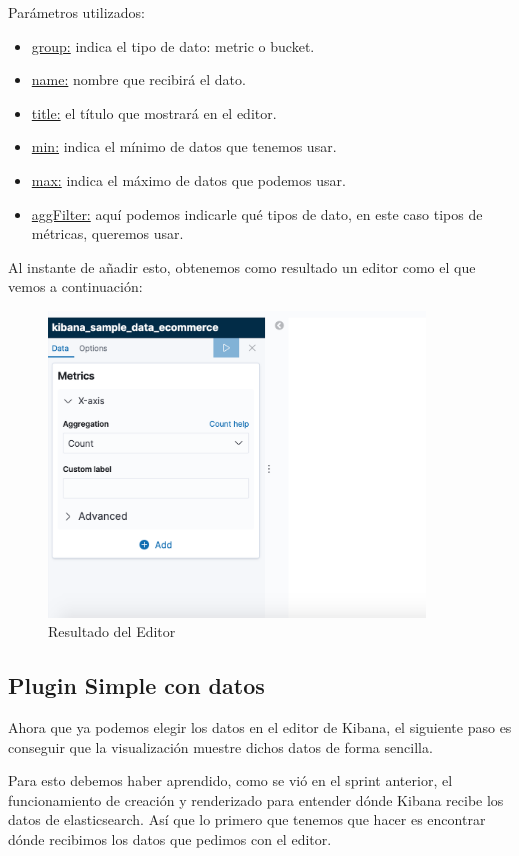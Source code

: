 \documentclass[a4paper, 12pt]{book}
\begin{document}
Parámetros utilizados:
\begin{itemize}
    \item \underline{group:} indica el tipo de dato: metric o bucket.
    \item \underline{name:} nombre que recibirá el dato.
    \item \underline{title:} el título que mostrará en el editor.
    \item \underline{min:} indica el mínimo de datos que tenemos usar.
    \item \underline{max:} indica el máximo de datos que podemos usar.
    \item \underline{aggFilter:} aquí podemos indicarle qué tipos de dato, en este caso tipos de métricas, queremos usar.
\end{itemize}

Al instante de añadir esto, obtenemos como resultado un editor como el que vemos a continuación:

\begin{figure}[H]
  \centering
  \includegraphics[width=10cm, keepaspectratio]{img/development/editor-resultado.png}
  \caption{Resultado del Editor}
  \label{fig:editor}
\end{figure}

\subsection{Plugin Simple con datos}
Ahora que ya podemos elegir los datos en el editor de Kibana, el siguiente paso es conseguir que la visualización muestre dichos datos de forma sencilla.

Para esto debemos haber aprendido, como se vió en el sprint anterior, el funcionamiento de creación y renderizado para entender dónde Kibana recibe los datos de elasticsearch. Así que lo primero que tenemos que hacer es encontrar dónde recibimos los datos que pedimos con el editor.
\end{document}
